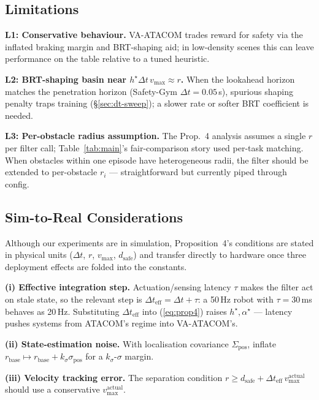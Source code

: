 \documentclass[letterpaper]{article}
\begin{document}
\subsection{Limitations}
\label{sec:limitations}

\textbf{L1: Conservative behaviour.} VA-ATACOM trades reward for safety via the inflated braking margin and BRT-shaping aid; in low-density scenes this can leave performance on the table relative to a tuned heuristic.

\textbf{L2: BRT-shaping basin near $h^\star \Delta t\,v_{\max} \approx r$.} When the lookahead horizon matches the penetration horizon (Safety-Gym $\Delta t{=}0.05$\,s), spurious shaping penalty traps training (\S\ref{sec:dt-sweep}); a slower rate or softer BRT coefficient is needed.

\textbf{L3: Per-obstacle radius assumption.} The Prop.~4 analysis assumes a single $r$ per filter call; Table~\ref{tab:main}'s fair-comparison story used per-task matching. When obstacles within one episode have heterogeneous radii, the filter should be extended to per-obstacle $r_i$ --- straightforward but currently piped through config.

\subsection{Sim-to-Real Considerations}
\label{sec:sim2real}

Although our experiments are in simulation, Proposition~4's conditions are stated in physical units ($\Delta t$, $r$, $v_{\max}$, $d_\text{safe}$) and transfer directly to hardware once three deployment effects are folded into the constants.

\textbf{(i) Effective integration step.} Actuation/sensing latency $\tau$ makes the filter act on stale state, so the relevant step is $\Delta t_\text{eff} = \Delta t + \tau$: a 50\,Hz robot with $\tau{=}30$\,ms behaves as 20\,Hz. Substituting $\Delta t_\text{eff}$ into (\ref{eq:prop4}) raises $h^\star, \alpha^\star$ --- latency pushes systems from ATACOM's regime into VA-ATACOM's.

\textbf{(ii) State-estimation noise.} With localisation covariance $\Sigma_\text{pos}$, inflate $r_\text{base} \mapsto r_\text{base} + k_\sigma\sigma_\text{pos}$ for a $k_\sigma$-$\sigma$ margin.

\textbf{(iii) Velocity tracking error.} The separation condition $r \ge d_\text{safe} + \Delta t_\text{eff}\,v_{\max}^\text{actual}$ should use a conservative $v_{\max}^\text{actual}$.
\end{document}
